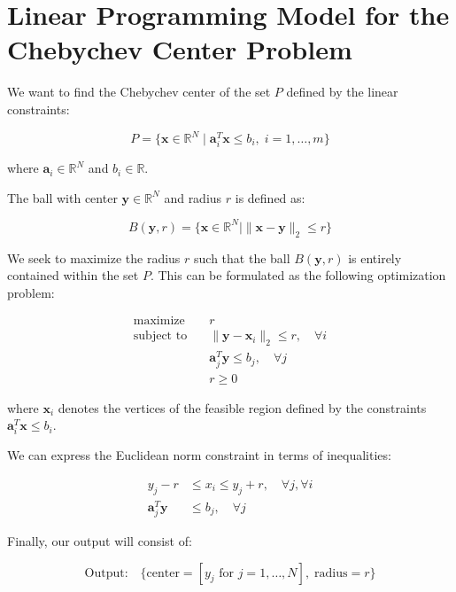 \documentclass{article}
\begin{document}
\section*{Linear Programming Model for the Chebychev Center Problem}

We want to find the Chebychev center of the set \( P \) defined by the linear constraints:

\[
P = \{ \mathbf{x} \in \mathbb{R}^N \mid \mathbf{a}_i^T \mathbf{x} \leq b_i, \; i = 1, \ldots, m \}
\]

where \( \mathbf{a}_i \in \mathbb{R}^N \) and \( b_i \in \mathbb{R} \).

The ball with center \( \mathbf{y} \in \mathbb{R}^N \) and radius \( r \) is defined as:

\[
B(\mathbf{y}, r) = \{ \mathbf{x} \in \mathbb{R}^N \mid \|\mathbf{x} - \mathbf{y}\|_2 \leq r \}
\]

We seek to maximize the radius \( r \) such that the ball \( B(\mathbf{y}, r) \) is entirely contained within the set \( P \). This can be formulated as the following optimization problem:

\[
\begin{align*}
\text{maximize} \quad & r \\
\text{subject to} \quad & \|\mathbf{y} - \mathbf{x}_i\|_2 \leq r, \quad \forall i \\
& \mathbf{a}_j^T \mathbf{y} \leq b_j, \quad \forall j \\
& r \geq 0
\end{align*}
\]

where \( \mathbf{x}_i \) denotes the vertices of the feasible region defined by the constraints \( \mathbf{a}_i^T \mathbf{x} \leq b_i \).

We can express the Euclidean norm constraint in terms of inequalities:

\[
\begin{align*}
y_j - r & \leq x_i \leq y_j + r, \quad \forall j, \forall i \\
\mathbf{a}_j^T \mathbf{y} & \leq b_j, \quad \forall j
\end{align*}
\]

Finally, our output will consist of:

\[
\text{Output:} \quad \{ \text{center} = [y_j \text{ for } j = 1, \ldots, N], \; \text{radius} = r \}
\]
\end{document}

